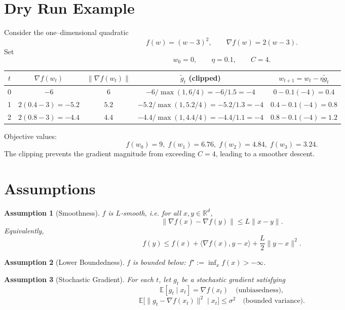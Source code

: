 \documentclass{article}
\newtheorem{assumption}{Assumption}
\newcommand{\E}{\mathbb{E}}
\newcommand{\R}{\mathbb{R}}
\begin{document}
\section*{Dry Run Example}
Consider the one–dimensional quadratic
\[
f(w)=(w-3)^{2},\qquad \nabla f(w)=2(w-3).
\]
Set
\[
w_{0}=0,\qquad \eta=0.1,\qquad C=4 .
\]

\begin{center}
\begin{tabular}{c|c|c|c|c}
$t$ & $\nabla f(w_{t})$ & $\| \nabla f(w_{t})\|$ & $\tilde g_{t}$ (clipped) & $w_{t+1}=w_{t}-\eta\tilde g_{t}$ \\ \hline
0 & $-6$ & $6$ & $-6/\max(1,6/4)=-6/1.5=-4$ & $0-0.1(-4)=0.4$ \\
1 & $2(0.4-3)=-5.2$ & $5.2$ & $-5.2/\max(1,5.2/4)=-5.2/1.3=-4$ & $0.4-0.1(-4)=0.8$ \\
2 & $2(0.8-3)=-4.4$ & $4.4$ & $-4.4/\max(1,4.4/4)=-4.4/1.1=-4$ & $0.8-0.1(-4)=1.2$
\end{tabular}
\end{center}

Objective values:
\[
f(w_{0})=9,\; f(w_{1})=6.76,\; f(w_{2})=4.84,\; f(w_{3})=3.24 .
\]
The clipping prevents the gradient magnitude from exceeding $C=4$, leading to a smoother descent.

\section*{Assumptions}
\begin{assumption}[Smoothness]\label{as:smooth}
$f$ is $L$‑smooth, i.e. for all $x,y\in\R^{d}$,
\[
\|\nabla f(x)-\nabla f(y)\|\le L\|x-y\|.
\]
Equivalently,
\[
f(y)\le f(x)+\langle\nabla f(x),y-x\rangle+\frac{L}{2}\|y-x\|^{2}.
\]
\end{assumption}

\begin{assumption}[Lower Boundedness]\label{as:lb}
$f$ is bounded below: $f^{\star}:=\inf_{x}f(x)>-\infty$.
\end{assumption}

\begin{assumption}[Stochastic Gradient]\label{as:stoch}
For each $t$, let $g_{t}$ be a stochastic gradient satisfying
\[
\E[g_{t}\mid x_{t}]=\nabla f(x_{t})\quad\text{(unbiasedness)},
\]
\[
\E\bigl[\|g_{t}-\nabla f(x_{t})\|^{2}\mid x_{t}\bigr]\le\sigma^{2}\quad\text{(bounded variance)}.
\]
\end{assumption}
\end{document}
